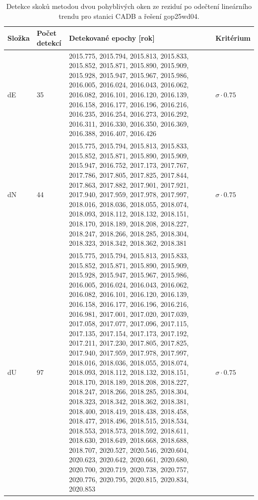 \begin{table}[htbp]
\caption{Detekce skoků metodou dvou pohyblivých oken ze reziduí po odečtení lineárního trendu pro stanici CADB a řešení gop25wd04.}
\label{tab:gop25wd04_stcd_cadb_detr_weighted_1seg_jumps_sliding_window}
\begin{tabular}{llll}
\toprule
Složka & Počet detekcí & Detekované epochy [rok] & Kritérium \\
\midrule
dE & 35 & 2015.775, 2015.794, 2015.813, 2015.833, 2015.852, 2015.871, 2015.890, 2015.909, 2015.928, 2015.947, 2015.967, 2015.986, 2016.005, 2016.024, 2016.043, 2016.062, 2016.082, 2016.101, 2016.120, 2016.139, 2016.158, 2016.177, 2016.196, 2016.216, 2016.235, 2016.254, 2016.273, 2016.292, 2016.311, 2016.330, 2016.350, 2016.369, 2016.388, 2016.407, 2016.426 & $\sigma \cdot 0.75$ \\
dN & 44 & 2015.775, 2015.794, 2015.813, 2015.833, 2015.852, 2015.871, 2015.890, 2015.909, 2015.947, 2016.752, 2017.173, 2017.767, 2017.786, 2017.805, 2017.825, 2017.844, 2017.863, 2017.882, 2017.901, 2017.921, 2017.940, 2017.959, 2017.978, 2017.997, 2018.016, 2018.036, 2018.055, 2018.074, 2018.093, 2018.112, 2018.132, 2018.151, 2018.170, 2018.189, 2018.208, 2018.227, 2018.247, 2018.266, 2018.285, 2018.304, 2018.323, 2018.342, 2018.362, 2018.381 & $\sigma \cdot 0.75$ \\
dU & 97 & 2015.775, 2015.794, 2015.813, 2015.833, 2015.852, 2015.871, 2015.890, 2015.909, 2015.928, 2015.947, 2015.967, 2015.986, 2016.005, 2016.024, 2016.043, 2016.062, 2016.082, 2016.101, 2016.120, 2016.139, 2016.158, 2016.177, 2016.196, 2016.216, 2016.981, 2017.001, 2017.020, 2017.039, 2017.058, 2017.077, 2017.096, 2017.115, 2017.135, 2017.154, 2017.173, 2017.192, 2017.211, 2017.230, 2017.805, 2017.825, 2017.940, 2017.959, 2017.978, 2017.997, 2018.016, 2018.036, 2018.055, 2018.074, 2018.093, 2018.112, 2018.132, 2018.151, 2018.170, 2018.189, 2018.208, 2018.227, 2018.247, 2018.266, 2018.285, 2018.304, 2018.323, 2018.342, 2018.362, 2018.381, 2018.400, 2018.419, 2018.438, 2018.458, 2018.477, 2018.496, 2018.515, 2018.534, 2018.553, 2018.573, 2018.592, 2018.611, 2018.630, 2018.649, 2018.668, 2018.688, 2018.707, 2020.527, 2020.546, 2020.604, 2020.623, 2020.642, 2020.661, 2020.680, 2020.700, 2020.719, 2020.738, 2020.757, 2020.776, 2020.795, 2020.815, 2020.834, 2020.853 & $\sigma \cdot 0.75$ \\
\bottomrule
\end{tabular}
\end{table}
